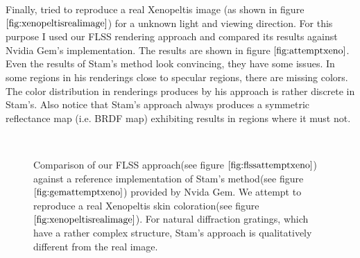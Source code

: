 Finally, tried to reproduce a real Xenopeltis image (as shown in figure $\ref{fig:xenopeltisrealimage}$) for a unknown light and viewing direction. For this purpose I used our FLSS rendering approach and compared its results against Nvidia Gem's implementation. The results are shown in figure $\ref{fig:attemptxeno}$. Even the results of Stam's method look convincing, they have some issues. In some regions in his renderings close to specular regions, there are missing colors. The color distribution in renderings produces by his approach is rather discrete in Stam's. Also notice that Stam's approach always produces a symmetric reflectance map (i.e. BRDF map) exhibiting results in regions where it must not. 

\begin{figure}[H]
  \centering

~  
  
\caption[Snake Renderings: Stam's- vs. Flss- Approach on Xenopeltis]{Comparison of our FLSS approach(see figure $\ref{fig:flssattemptxeno}$) against a reference implementation of Stam's method(see figure $\ref{fig:gemattemptxeno}$) provided by Nvida Gem. We attempt to reproduce a real Xenopeltis skin coloration(see figure $\ref{fig:xenopeltisrealimage}$). For natural diffraction gratings, which have a rather complex structure, Stam's approach is qualitatively different from the real image.}
\label{fig:attemptxeno}
\end{figure}